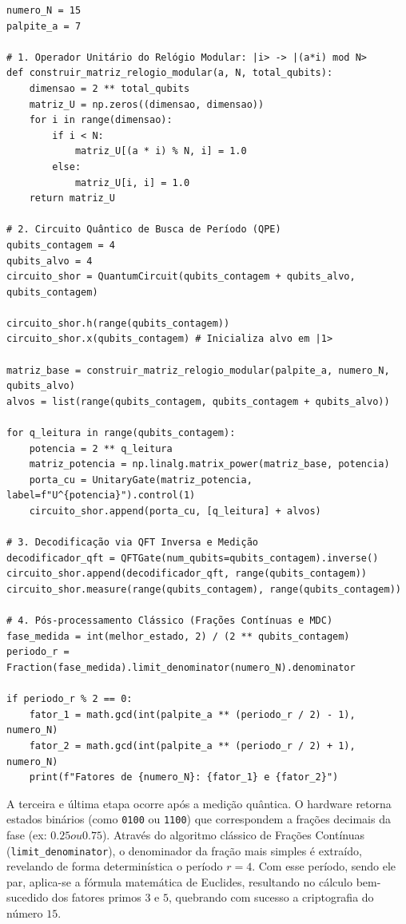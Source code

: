 \documentclass[12pt, a4paper]{article}
\begin{document}
\begin{lstlisting}[caption={Implementação híbrida do Algoritmo de Shor fatorando o número 15.}]
numero_N = 15
palpite_a = 7

# 1. Operador Unitário do Relógio Modular: |i> -> |(a*i) mod N>
def construir_matriz_relogio_modular(a, N, total_qubits):
    dimensao = 2 ** total_qubits
    matriz_U = np.zeros((dimensao, dimensao))
    for i in range(dimensao):
        if i < N:
            matriz_U[(a * i) % N, i] = 1.0
        else:
            matriz_U[i, i] = 1.0
    return matriz_U

# 2. Circuito Quântico de Busca de Período (QPE)
qubits_contagem = 4
qubits_alvo = 4
circuito_shor = QuantumCircuit(qubits_contagem + qubits_alvo, qubits_contagem)

circuito_shor.h(range(qubits_contagem))
circuito_shor.x(qubits_contagem) # Inicializa alvo em |1>

matriz_base = construir_matriz_relogio_modular(palpite_a, numero_N, qubits_alvo)
alvos = list(range(qubits_contagem, qubits_contagem + qubits_alvo))

for q_leitura in range(qubits_contagem):
    potencia = 2 ** q_leitura
    matriz_potencia = np.linalg.matrix_power(matriz_base, potencia)
    porta_cu = UnitaryGate(matriz_potencia, label=f"U^{potencia}").control(1)
    circuito_shor.append(porta_cu, [q_leitura] + alvos)

# 3. Decodificação via QFT Inversa e Medição
decodificador_qft = QFTGate(num_qubits=qubits_contagem).inverse()
circuito_shor.append(decodificador_qft, range(qubits_contagem))
circuito_shor.measure(range(qubits_contagem), range(qubits_contagem))

# 4. Pós-processamento Clássico (Frações Contínuas e MDC)
fase_medida = int(melhor_estado, 2) / (2 ** qubits_contagem)
periodo_r = Fraction(fase_medida).limit_denominator(numero_N).denominator

if periodo_r % 2 == 0:
    fator_1 = math.gcd(int(palpite_a ** (periodo_r / 2) - 1), numero_N)
    fator_2 = math.gcd(int(palpite_a ** (periodo_r / 2) + 1), numero_N)
    print(f"Fatores de {numero_N}: {fator_1} e {fator_2}")
\end{lstlisting}

A terceira e última etapa ocorre após a medição quântica. O hardware retorna estados binários (como \texttt{0100} ou \texttt{1100}) que correspondem a frações decimais da fase (ex: $0.25 ou 0.75$). Através do algoritmo clássico de Frações Contínuas (\texttt{limit\_denominator}), o denominador da fração mais simples é extraído, revelando de forma determinística o período $r = 4$. Com esse período, sendo ele par, aplica-se a fórmula matemática de Euclides, resultando no cálculo bem-sucedido dos fatores primos $3$ e $5$, quebrando com sucesso a criptografia do número $15$.
\end{document}
